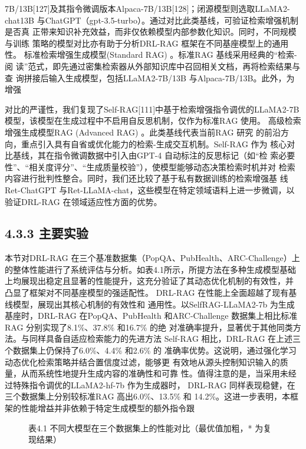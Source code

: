 \documentclass[12pt,a4paper,openright,UTF8]{ctexbook}
\begin{document}
7B/13B[127]及其指令微调版本Alpaca-7B/13B[128]；闭源模型则选取LLaMA2-chat13B 与ChatGPT（gpt-3.5-turbo）。通过对比此类基线，可验证检索增强机制是否真 正带来知识补充效益，而非仅依赖模型内部参数化知识。同时，不同规模与训练 策略的模型对比亦有助于分析DRL-RAG 框架在不同基座模型上的通用性。 标准检索增强生成模型(Standard RAG) 。标准RAG 基线采用经典的“检索-阅 读”范式，即先通过密集检索器从外部知识库中召回相关文档，再将检索结果与查 询拼接后输入生成模型，包括LLaMA2-7B/13B 与Alpaca-7B/13B。此外，为增强

对比的严谨性，我们复现了Self-RAG[111]中基于检索增强指令调优的LLaMA2-7B 模型，该模型在生成过程中不启用自反思机制，仅作为标准RAG 使用。 高级检索增强生成模型RAG (Advanced RAG) 。此类基线代表当前RAG 研究 的前沿方向，重点引入具有自省或优化能力的检索-生成交互机制。Self-RAG 作为 核心对比基线，其在指令微调数据中引入由GPT-4 自动标注的反思标记（如“检 索必要性”、“相关度评分”、“生成质量校验”），使模型能够动态决策检索时机并对 检索内容进行批判性整合。同时，我们还比较了基于私有数据训练的检索增强基 线Ret-ChatGPT 与Ret-LLaMA-chat，这些模型在特定领域语料上进一步微调，以 验证DRL-RAG 在领域适应性方面的优势。

\subsection{4.3.3 主要实验}

本节对DRL-RAG 在三个基准数据集（PopQA、PubHealth、ARC-Challenge）上 的整体性能进行了系统评估与分析。如表4.1所示，所提方法在多种生成模型基础 上均展现出稳定且显著的性能提升，这充分验证了其动态优化机制的有效性，并 凸显了框架对不同基座模型的强适配性。 DRL-RAG 在性能上全面超越了现有基线模型，展现出其核心机制的有效性和 通用性。以SelfRAG-LLaMA2-7b 为生成基座时，DRL-RAG 在PopQA、PubHealth 和ARC-Challenge 数据集上相比标准RAG 分别实现了8.1\%、37.8\% 和16.7\% 的绝 对准确率提升，显著优于其他同类方法。与同样具备自适应检索能力的先进方法 Self-RAG 相比，DRL-RAG 在上述三个数据集上仍保持了6.0\%、4.4\% 和2.6\% 的 准确率优势。这说明，通过强化学习动态优化检索策略并结合置信度过滤，能够更 有效地从源头控制知识输入的质量，从而系统性地提升生成内容的准确性和可靠 性。值得注意的是，当采用未经过特殊指令调优的LLaMA2-hf-7b 作为生成器时， DRL-RAG 同样表现稳健，在三个数据集上分别较标准RAG 高出6.0\%、13.5\% 和 14.2\%。这进一步表明，本框架的性能增益并非依赖于特定生成模型的额外指令跟

\begin{figure}[htbp]
\centering
{}
\caption{表4.1 不同大模型在三个数据集上的性能对比（最优值加粗，* 为复现结果）}
\end{figure}
\end{document}
